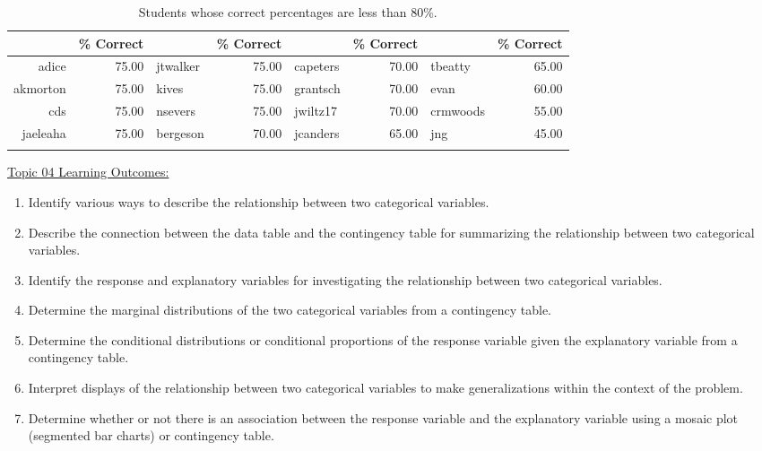 \documentclass[12pt,english,nohyper]{tufte-handout}\usepackage[]{graphicx}\usepackage[]{color}
\begin{document}
\begin{fullwidth}
\makeatletter\setlength\hsize{\@tufte@fullwidth}\makeatother
\begin{longtable}{rr|lr|lr|lr}
  \hline
  & \% Correct &   & \% Correct &   & \% Correct &   & \% Correct \\ 
  \hline
adice & 75.00 & jtwalker & 75.00 & capeters & 70.00 & tbeatty & 65.00 \\ 
  akmorton & 75.00 & kives & 75.00 & grantsch & 70.00 & evan & 60.00 \\ 
  cds & 75.00 & nsevers & 75.00 & jwiltz17 & 70.00 & crmwoods & 55.00 \\ 
  jaeleaha & 75.00 & bergeson & 70.00 & jcanders & 65.00 & jng & 45.00 \\ 
   \hline
\hline
\caption{Students whose correct percentages are less than 80\%.} 
\label{tab:studentsbelow80}
\end{longtable}

\end{fullwidth}



\vspace{-2mm}

\noindent
\underline{Topic 04 Learning Outcomes:}
\vspace{2mm}

\begin{fullwidth}
\begin{enumerate}[label=\Alph*.,itemsep=-\parsep,leftmargin=*]
  \item
Identify various ways to describe the relationship between two categorical variables.
\item Describe the connection between the data table and the contingency table for summarizing the relationship between two categorical variables.
\item Identify the response and explanatory variables for investigating the relationship between two categorical variables.
\item Determine the marginal distributions of the two categorical variables from a contingency table.
\item Determine the conditional distributions or conditional proportions of the response variable given the explanatory variable from a contingency table.
\item Interpret displays of the relationship between two categorical variables to make generalizations within the context of the problem.
\item Determine whether or not there is an association between the response variable and the explanatory variable using a mosaic plot (segmented bar charts) or contingency table.

\end{enumerate}
\end{fullwidth}
\end{document}
